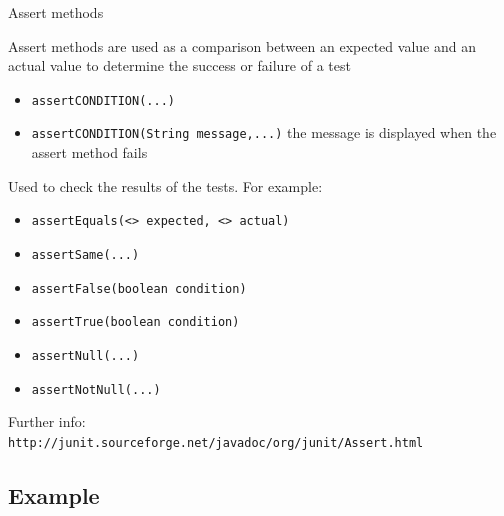 \documentclass[11pt, xcolor=svgnames]{beamer}
\begin{document}

\begin{frame}{Assert methods}


Assert methods are used as a comparison between an expected value and an actual value to determine the success or failure of a test

    \begin{itemize}
      \item \texttt{assertCONDITION(...)}
      \item \texttt{assertCONDITION(String message,...)}  the message is displayed when the assert method fails
    \end{itemize}

Used to check the results of the tests. For example:
    \begin{itemize}
      \item \texttt{assertEquals(<> expected, <> actual)}
      \item \texttt{assertSame(...)} 
      \item \texttt{assertFalse(boolean condition)}
      \item \texttt{assertTrue(boolean condition)}
      \item \texttt{assertNull(...)}
      \item \texttt{assertNotNull(...)}

    \end{itemize}
    Further info:\\
    \texttt{http://junit.sourceforge.net/javadoc/org/junit/Assert.html}

\end{frame}





\subsection{Example}

\end{document}
